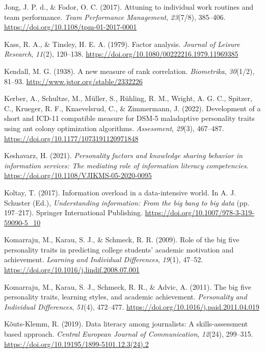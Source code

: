\documentclass[
  12pt,
  a4paper,
  twoside]{article}
\newlength{\cslhangindent}
\newenvironment{CSLReferences}[2] %
 {\begin{list}{}{%
  \setlength{\itemindent}{0pt}
  \setlength{\leftmargin}{0pt}
  \setlength{\parsep}{0pt}
  \ifodd #1
   \setlength{\leftmargin}{\cslhangindent}
   \setlength{\itemindent}{-1\cslhangindent}
  \fi
  \setlength{\itemsep}{#2\baselineskip}}}
 {\end{list}}
\begin{document}
\begin{CSLReferences}{1}{0}
Jong, J. P. d., \& Fodor, O. C. (2017). Attuning to individual work routines and team performance. \emph{Team Performance Management}, \emph{23}(7/8), 385--406. \url{https://doi.org/10.1108/tpm-01-2017-0001}

Kass, R. A., \& Tinsley, H. E. A. (1979). Factor analysis. \emph{Journal of Leisure Research}, \emph{11}(2), 120--138. \url{https://doi.org/10.1080/00222216.1979.11969385}

Kendall, M. G. (1938). A new measure of rank correlation. \emph{Biometrika}, \emph{30}(1/2), 81--93. \url{http://www.jstor.org/stable/2332226}

Kerber, A., Schultze, M., Müller, S., Rühling, R. M., Wright, A. G. C., Spitzer, C., Krueger, R. F., Knaevelsrud, C., \& Zimmermann, J. (2022). Development of a short and ICD-11 compatible measure for DSM-5 maladaptive personality traits using ant colony optimization algorithms. \emph{Assessment}, \emph{29}(3), 467--487. \url{https://doi.org/10.1177/1073191120971848}

Keshavarz, H. (2021). \emph{Personality factors and knowledge sharing behavior in information services: The mediating role of information literacy competencies}. \url{https://doi.org/10.1108/VJIKMS-05-2020-0095}

Koltay, T. (2017). Information overload in a data-intensive world. In A. J. Schuster (Ed.), \emph{Understanding information: From the big bang to big data} (pp. 197--217). Springer International Publishing. \url{https://doi.org/10.1007/978-3-319-59090-5_10}

Komarraju, M., Karau, S. J., \& Schmeck, R. R. (2009). Role of the big five personality traits in predicting college students' academic motivation and achievement. \emph{Learning and Individual Differences}, \emph{19}(1), 47--52. \url{https://doi.org/10.1016/j.lindif.2008.07.001}

Komarraju, M., Karau, S. J., Schmeck, R. R., \& Advic, A. (2011). The big five personality traits, learning styles, and academic achievement. \emph{Personality and Individual Differences}, \emph{51}(4), 472--477. \url{https://doi.org/10.1016/j.paid.2011.04.019}

Kõuts-Klemm, R. (2019). Data literacy among journalists: A skills-assessment based approach. \emph{Central European Journal of Communication}, \emph{12}(24), 299--315. \url{https://doi.org/10.19195/1899-5101.12.3(24).2}


\end{CSLReferences}
\end{document}
